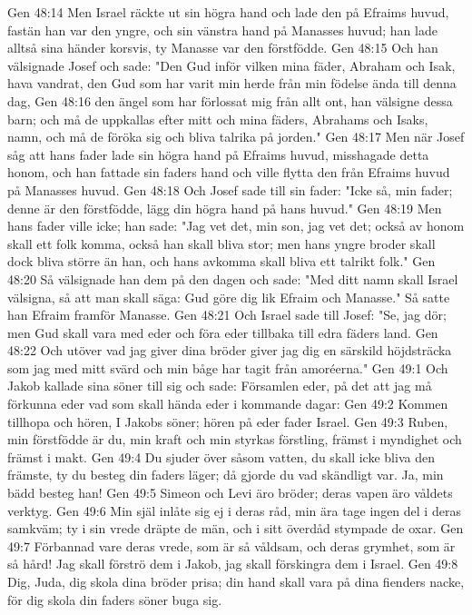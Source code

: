 Gen 48:14  Men Israel räckte ut sin högra hand och lade den på Efraims huvud, fastän han var den yngre, och sin vänstra hand på Manasses huvud; han lade alltså sina händer korsvis, ty Manasse var den förstfödde.
Gen 48:15  Och han välsignade Josef och sade: "Den Gud inför vilken mina fäder, Abraham och Isak, hava vandrat, den Gud som har varit min herde från min födelse ända till denna dag,
Gen 48:16  den ängel som har förlossat mig från allt ont, han välsigne dessa barn; och må de uppkallas efter mitt och mina fäders, Abrahams och Isaks, namn, och må de föröka sig och bliva talrika på jorden."
Gen 48:17  Men när Josef såg att hans fader lade sin högra hand på Efraims huvud, misshagade detta honom, och han fattade sin faders hand och ville flytta den från Efraims huvud på Manasses huvud.
Gen 48:18  Och Josef sade till sin fader: "Icke så, min fader; denne är den förstfödde, lägg din högra hand på hans huvud."
Gen 48:19  Men hans fader ville icke; han sade: "Jag vet det, min son, jag vet det; också av honom skall ett folk komma, också han skall bliva stor; men hans yngre broder skall dock bliva större än han, och hans avkomma skall bliva ett talrikt folk."
Gen 48:20  Så välsignade han dem på den dagen och sade: "Med ditt namn skall Israel välsigna, så att man skall säga: Gud göre dig lik Efraim och Manasse." Så satte han Efraim framför Manasse.
Gen 48:21  Och Israel sade till Josef: "Se, jag dör; men Gud skall vara med eder och föra eder tillbaka till edra fäders land.
Gen 48:22  Och utöver vad jag giver dina bröder giver jag dig en särskild höjdsträcka som jag med mitt svärd och min båge har tagit från amoréerna."
Gen 49:1  Och Jakob kallade sina söner till sig och sade: Församlen eder, på det att jag må förkunna eder vad som skall hända eder i kommande dagar:
Gen 49:2  Kommen tillhopa och hören, I Jakobs söner; hören på eder fader Israel.
Gen 49:3  Ruben, min förstfödde är du, min kraft och min styrkas förstling, främst i myndighet och främst i makt.
Gen 49:4  Du sjuder över såsom vatten, du skall icke bliva den främste, ty du besteg din faders läger; då gjorde du vad skändligt var. Ja, min bädd besteg han!
Gen 49:5  Simeon och Levi äro bröder; deras vapen äro våldets verktyg.
Gen 49:6  Min själ inlåte sig ej i deras råd, min ära tage ingen del i deras samkväm; ty i sin vrede dräpte de män, och i sitt överdåd stympade de oxar.
Gen 49:7  Förbannad vare deras vrede, som är så våldsam, och deras grymhet, som är så hård! Jag skall förströ dem i Jakob, jag skall förskingra dem i Israel.
Gen 49:8  Dig, Juda, dig skola dina bröder prisa; din hand skall vara på dina fienders nacke, för dig skola din faders söner buga sig.
